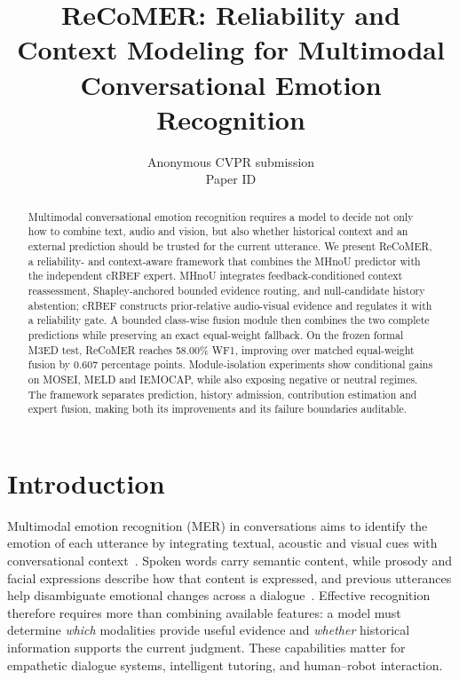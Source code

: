 \documentclass[10pt,twocolumn,letterpaper]{article}
\title{ReCoMER: Reliability and Context Modeling for Multimodal\\Conversational Emotion Recognition}
\author{Anonymous CVPR submission\\
Paper ID \paperID}
\begin{document}
\maketitle

\begin{abstract}
Multimodal conversational emotion recognition requires a model to decide not only how to combine text, audio and vision, but also whether historical context and an external prediction should be trusted for the current utterance.
We present ReCoMER, a reliability- and context-aware framework that combines the MHnoU predictor with the independent cRBEF expert.
MHnoU integrates feedback-conditioned context reassessment, Shapley-anchored bounded evidence routing, and null-candidate history abstention; cRBEF constructs prior-relative audio-visual evidence and regulates it with a reliability gate.
A bounded class-wise fusion module then combines the two complete predictions while preserving an exact equal-weight fallback.
On the frozen formal M3ED test, ReCoMER reaches 58.00\% WF1, improving over matched equal-weight fusion by 0.607 percentage points.
Module-isolation experiments show conditional gains on MOSEI, MELD and IEMOCAP, while also exposing negative or neutral regimes.
The framework separates prediction, history admission, contribution estimation and expert fusion, making both its improvements and its failure boundaries auditable.
\end{abstract}

\section{Introduction}
\label{sec:intro}

Multimodal emotion recognition (MER) in conversations aims to identify the emotion of each utterance by integrating textual, acoustic and visual cues with conversational context~\cite{majumder2019dialoguernn,poria2019meld,zhao2022m3ed}.
Spoken words carry semantic content, while prosody and facial expressions describe how that content is expressed, and previous utterances help disambiguate emotional changes across a dialogue~\cite{busso2008iemocap,zadeh2018cmumosei}.
Effective recognition therefore requires more than combining available features: a model must determine \emph{which} modalities provide useful evidence and \emph{whether} historical information supports the current judgment.
These capabilities matter for empathetic dialogue systems, intelligent tutoring, and human--robot interaction.
\end{document}

